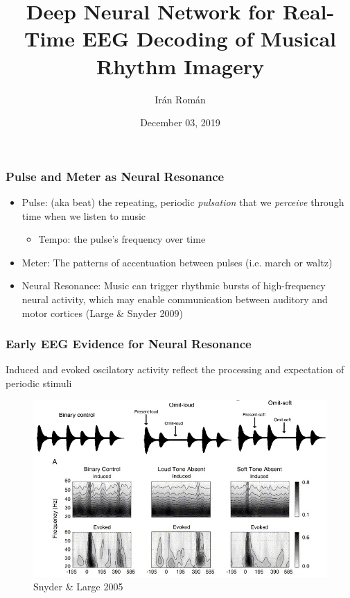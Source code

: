 \documentclass{beamer}
\title{Deep Neural Network for Real-Time EEG Decoding of Musical Rhythm Imagery}
\author{Ir\'{a}n Rom\'{a}n}
\date{December 03, 2019}
\begin{document}

\maketitle

\begin{frame}
	\frametitle{Pulse and Meter as Neural Resonance}
	
	\begin{itemize}

		\item Pulse: (aka beat) the repeating, periodic \textit{pulsation} 
			that we \textit{perceive} through time when we listen to music
		\begin{itemize}
			\item Tempo: the pulse's frequency over time
		\end{itemize}

		\item Meter: The patterns of accentuation between pulses (i.e. march or waltz)

		\item Neural Resonance: Music can trigger rhythmic bursts of high-frequency neural activity,
			 which may enable communication between auditory and motor cortices (Large \& Snyder 2009)

	\end{itemize}

\end{frame}

\begin{frame}
	\frametitle{Early EEG Evidence for Neural Resonance}

	Induced and evoked oscilatory activity reflect the processing and expectation of periodic stimuli

	\begin{figure}
		\centering
		\includegraphics[scale=2.5]{fig1.png}
		\caption{Snyder \& Large 2005}
	\end{figure}

\end{frame}
\end{document}
